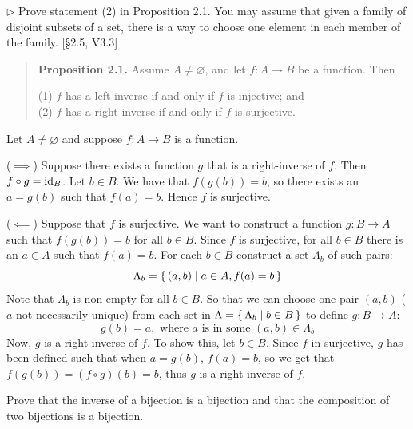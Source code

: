 \begin{problem}[2.2]
	$\rhd$ Prove statement (2) in Proposition 2.1. You may assume that given a
	family of disjoint subsets of a set, there is a way to choose one element in
	each member of the family. [\S2.5, V3.3]
	
	
\end{problem}
\begin{quote} 
	\textbf{Proposition 2.1.} Assume $A\neq\varnothing$, and let $f:A\to
	B$ be a function. Then
	
	(1) $f$ has a left-inverse if and only if $f$ is injective; and \\
	(2) $f$ has a right-inverse if and only if $f$ is surjective.
\end{quote}
\begin{solution}
	
	Let $A\neq\varnothing$ and suppose $f:A\to B$ is a function.
	
	($\implies$) Suppose there exists a function $g$ that is a right-inverse of $f$.
	Then $f\circ g = \mathrm{id}_B$. Let $b\in B$. We have that $f(g(b)) = b$, so there
	exists an $a = g(b)$ such that $f(a) = b$. Hence $f$ is surjective.
	
	($\impliedby$) Suppose that $f$ is surjective. We want to construct a function
	$g:B\to A$ such that $f(g(b)) = b$ for all $b\in B$. Since $f$ is surjective,
	for all $b\in B$ there is an $a\in A$ such that $f(a) = b$. For each $b\in B$
	construct a set $\Lambda_b$ of such pairs:
	\[ \Lambda_b = \left\{\, (a,b) \mid a \in A, f(a) = b \,\right\} \]
	Note that $\Lambda_b$ is non-empty for all $b\in B$. So that we can choose one
	pair $(a,b)$ ($a$ not necessarily unique) from each set in $\Lambda =
	\left\{\,\Lambda_b\mid b\in B\,\right\}$ to define $g:B\to A$:
	\[ g(b) = a, \text{ where $a$ is in some $(a,b)\in\Lambda_b$} \]
	Now, $g$ is a right-inverse of $f$. To show this, let $b\in B$. Since $f$ in
	surjective, $g$ has been defined such that when $a=g(b)$, $f(a)=b$, so we get
	that $f(g(b)) = (f\circ g)(b) = b$, thus $g$ is a right-inverse of $f$.
\end{solution}


\begin{problem}[2.3]
	Prove that the inverse of a bijection is a bijection and that the
	composition of two bijections is a bijection.
\end{problem}

